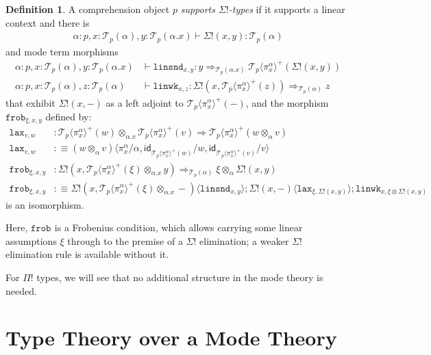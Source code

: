 \documentclass[10pt]{article}
\theoremstyle{definition}
\newtheorem{definition}{Definition}
\newcommand{\yields}{\vdash}
\newcommand{\tcell}{\Rightarrow}
\newcommand{\id}{\mathsf{id}}
\newcommand\TrPlus[2]{\ensuremath{{#1}^+(#2)}}
\newcommand\El[2]{\mathcal{T}_{#1}(#2)}
\newcommand\ApEl[2]{\mathcal{T}_{#1}\langle#2\rangle}
\newcommand\ap[2]{\ensuremath{#1 \langle #2 \rangle }}
\newcommand{\linsnd}[1]{\mathtt{linsnd}_{#1}}
\newcommand{\linwk}[1]{\mathtt{linwk}_{#1}}
\newcommand{\frob}[1]{\mathtt{frob}_{#1}}
\begin{document}
\begin{definition}\label{def:supports-sigma-bangs}
A comprehension object $p$ \emph{supports $\Sigma!$-types} if it supports a linear context and there is
\begin{align*}
\alpha : p, x : \El{p}{\alpha}, y : \El{p}{\alpha.x} \yields \Sigma!(x,y) : \El{p}{\alpha}
\end{align*}
and mode term morphisms
\begin{align*}
\alpha : p, x : \El{p}{\alpha}, y : \El{p}{\alpha.x} &\yields \linsnd{x,y} : y \tcell_{\El{p}{\alpha.x}} \TrPlus{\ApEl{p}{\pi^\alpha_x}}{\Sigma!(x,y)} \\
\alpha : p, x : \El{p}{\alpha}, z : \El{p}{\alpha} &\yields \linwk{x,z} : \Sigma!(x, \TrPlus{\ApEl{p}{\pi^\alpha_x}}{z}) \tcell_{\El{p}{\alpha}} z
\end{align*}
that exhibit $\Sigma!(x,-)$ as a left adjoint to $\TrPlus{\ApEl{p}{\pi^\alpha_x}}{-}$, and the morphism $\frob{\xi, x, y}$ defined by:
\begin{align*}
\mathtt{lax}_{v,w} &: \TrPlus{\ApEl{p}{\pi^\alpha_x}}{w} \otimes_{\alpha.x} \TrPlus{\ApEl{p}{\pi^\alpha_x}}{v} \tcell \TrPlus{\ApEl{p}{\pi^\alpha_x}}{w \otimes_\alpha v} \\
\mathtt{lax}_{v,w} &:\equiv \ap{(w \otimes_\alpha v)}{\pi^\alpha_x / \alpha, \id_{\TrPlus{\ApEl{p}{\pi^\alpha_x}}{w}}/w, \id_{\TrPlus{\ApEl{p}{\pi^\alpha_x}}{v}}/v} \\
\frob{\xi, x, y} &: \Sigma!(x, \TrPlus{\ApEl{p}{\pi^\alpha_x}}{\xi} \otimes_{\alpha.x} y) \tcell_{\El{p}{\alpha}} \xi \otimes_\alpha \Sigma!(x, y) \\
\frob{\xi, x, y} &:\equiv \ap{\Sigma!(x, \TrPlus{\ApEl{p}{\pi^\alpha_x}}{\xi} \otimes_{\alpha.x} -)}{\linsnd{x,y}} ; \ap{\Sigma!(x, -)}{\mathtt{lax}_{\xi, \Sigma!(x,y)}} ; \linwk{x, \xi \otimes \Sigma!(x,y)}
\end{align*}
is an isomorphism.
\end{definition}
Here, $\frob{}$ is a Frobenius condition, which allows carrying some
linear assumptions $\xi$ through to the premise of a $\Sigma!$
elimination; a weaker $\Sigma!$ elimination rule is available without
it.

For $\Pi!$ types, we will see that no additional structure in the mode theory is needed.

\section{Type Theory over a Mode Theory}
\label{sec:top-syntax}
\end{document}
